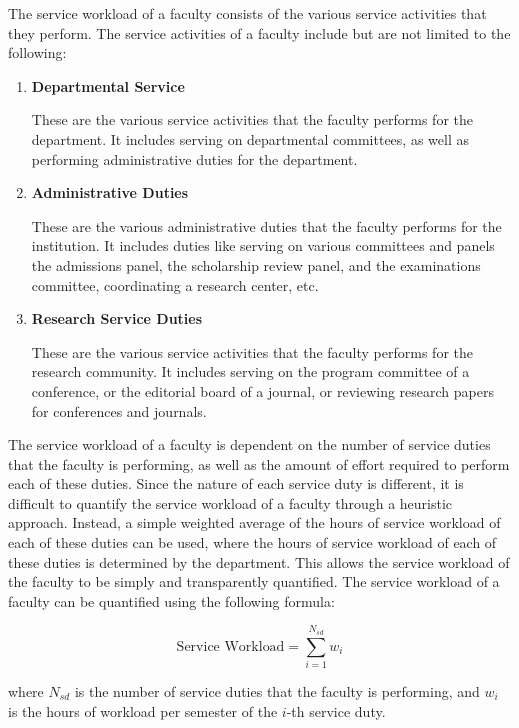 The service workload of a faculty consists of the various service activities that they perform. The service activities of a faculty include but are not limited to the following:

\begin{enumerate}

  \item \textbf{Departmental Service}

        These are the various service activities that the faculty performs for the department. It includes serving on departmental committees, as well as performing administrative duties for the department.

  \item \textbf{Administrative Duties}

        These are the various administrative duties that the faculty performs for the institution. It includes duties like serving on various committees and panels the admissions panel, the scholarship review panel, and the examinations committee, coordinating a research center, etc.

  \item \textbf{Research Service Duties}

        These are the various service activities that the faculty performs for the research community. It includes serving on the program committee of a conference, or the editorial board of a journal, or reviewing research papers for conferences and journals.

\end{enumerate}

The service workload of a faculty is dependent on the number of service duties that the faculty is performing, as well as the amount of effort required to perform each of these duties. Since the nature of each service duty is different, it is difficult to quantify the service workload of a faculty through a heuristic approach. Instead, a simple weighted average of the hours of service workload of each of these duties can be used, where the hours of service workload of each of these duties is determined by the department. This allows the service workload of the faculty to be simply and transparently quantified. The service workload of a faculty can be quantified using the following formula:

\begin{equation*}
  \text{Service Workload} = \sum_{i=1}^{N_{sd}} w_i
\end{equation*}

where $N_{sd}$ is the number of service duties that the faculty is performing, and $w_i$ is the hours of workload per semester of the $i$-th service duty.


